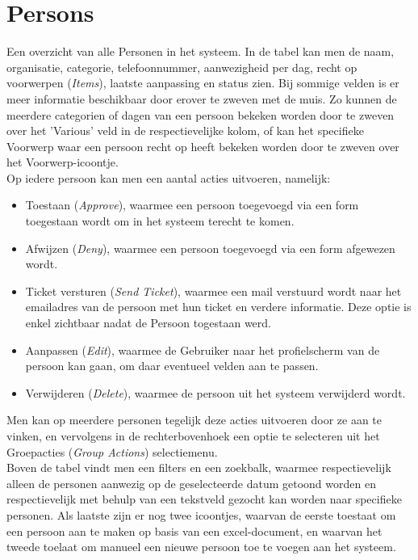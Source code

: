 \documentclass[]{memoir}
\begin{document}
\section{Persons} \label{Persons}
Een overzicht van alle Personen in het systeem. In de tabel kan men de naam, organisatie, categorie, telefoonnummer, aanwezigheid per dag, recht op voorwerpen (\textsl{Items}), laatste aanpassing en status zien. Bij sommige velden is er meer informatie beschikbaar door erover te zweven met de muis. Zo kunnen de meerdere categorien of dagen van een persoon bekeken worden door te zweven over het 'Various' veld in de respectievelijke kolom, of kan het specifieke Voorwerp waar een persoon recht op heeft bekeken worden door te zweven over het Voorwerp-icoontje.\\
Op iedere persoon kan men een aantal acties uitvoeren, namelijk:
\begin{itemize}
	\item Toestaan (\textsl{Approve}), waarmee een persoon toegevoegd via een form toegestaan wordt om in het systeem terecht te komen.
	\item Afwijzen  (\textsl{Deny}), waarmee een persoon toegevoegd via een form afgewezen wordt.
	\item Ticket versturen (\textsl{Send Ticket}), waarmee een mail verstuurd wordt naar het emailadres van de persoon met hun ticket en verdere informatie. Deze optie is enkel zichtbaar nadat de Persoon togestaan werd.
	\item Aanpassen (\textsl{Edit}), waarmee de Gebruiker naar het profielscherm van de persoon kan gaan, om daar eventueel velden aan te passen.
	\item Verwijderen (\textsl{Delete}), waarmee de persoon uit het systeem verwijderd wordt.
\end{itemize}

Men kan op meerdere personen tegelijk deze acties uitvoeren door ze aan te vinken, en vervolgens in de rechterbovenhoek een optie te selecteren uit het Groepacties  (\textsl{Group Actions}) selectiemenu.\\
Boven de tabel vindt men een filters en een zoekbalk, waarmee respectievelijk alleen de personen aanwezig op de geselecteerde datum getoond worden en respectievelijk met behulp van een tekstveld gezocht kan worden naar specifieke personen. Als laatste zijn er nog twee icoontjes, waarvan de eerste toestaat om een persoon aan te maken op basis van een excel-document, en waarvan het tweede toelaat om manueel een nieuwe persoon toe te voegen aan het systeem.\\
\end{document}
